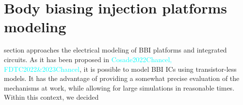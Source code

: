 
\section{Body biasing injection platforms modeling}
 section approaches the electrical modeling of BBI platforms and integrated circuits.
As it has been proposed in \textcolor{cyan}{Cosade2022Chancel, FDTC2022\&2023Chancel}, it is possible to model BBI ICs using transistor-less models.
It has the advantage of providing a somewhat precise evaluation of the mechanisms at work, while allowing for large simulations in reasonable times.
Within this context, we decided
